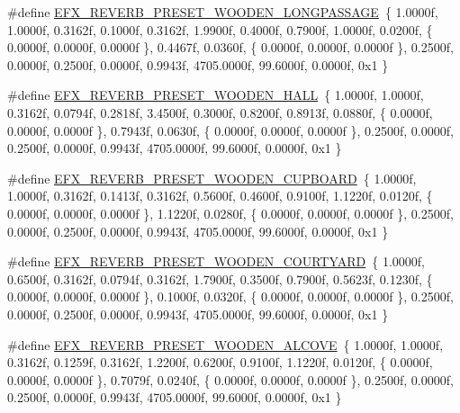 \begin{DoxyCompactItemize}
\item 
\#define \mbox{\hyperlink{efx-presets_8h_a18f21a9772e28cbc29f02cd7e52acff0}{E\+F\+X\+\_\+\+R\+E\+V\+E\+R\+B\+\_\+\+P\+R\+E\+S\+E\+T\+\_\+\+W\+O\+O\+D\+E\+N\+\_\+\+L\+O\+N\+G\+P\+A\+S\+S\+A\+GE}}~\{ 1.\+0000f, 1.\+0000f, 0.\+3162f, 0.\+1000f, 0.\+3162f, 1.\+9900f, 0.\+4000f, 0.\+7900f, 1.\+0000f, 0.\+0200f, \{ 0.\+0000f, 0.\+0000f, 0.\+0000f \}, 0.\+4467f, 0.\+0360f, \{ 0.\+0000f, 0.\+0000f, 0.\+0000f \}, 0.\+2500f, 0.\+0000f, 0.\+2500f, 0.\+0000f, 0.\+9943f, 4705.\+0000f, 99.\+6000f, 0.\+0000f, 0x1 \}
\item 
\#define \mbox{\hyperlink{efx-presets_8h_a15b475fde8954f5094393b00533d6684}{E\+F\+X\+\_\+\+R\+E\+V\+E\+R\+B\+\_\+\+P\+R\+E\+S\+E\+T\+\_\+\+W\+O\+O\+D\+E\+N\+\_\+\+H\+A\+LL}}~\{ 1.\+0000f, 1.\+0000f, 0.\+3162f, 0.\+0794f, 0.\+2818f, 3.\+4500f, 0.\+3000f, 0.\+8200f, 0.\+8913f, 0.\+0880f, \{ 0.\+0000f, 0.\+0000f, 0.\+0000f \}, 0.\+7943f, 0.\+0630f, \{ 0.\+0000f, 0.\+0000f, 0.\+0000f \}, 0.\+2500f, 0.\+0000f, 0.\+2500f, 0.\+0000f, 0.\+9943f, 4705.\+0000f, 99.\+6000f, 0.\+0000f, 0x1 \}
\item 
\#define \mbox{\hyperlink{efx-presets_8h_abdaf8eba9ef400263b72b92ef4d4ab23}{E\+F\+X\+\_\+\+R\+E\+V\+E\+R\+B\+\_\+\+P\+R\+E\+S\+E\+T\+\_\+\+W\+O\+O\+D\+E\+N\+\_\+\+C\+U\+P\+B\+O\+A\+RD}}~\{ 1.\+0000f, 1.\+0000f, 0.\+3162f, 0.\+1413f, 0.\+3162f, 0.\+5600f, 0.\+4600f, 0.\+9100f, 1.\+1220f, 0.\+0120f, \{ 0.\+0000f, 0.\+0000f, 0.\+0000f \}, 1.\+1220f, 0.\+0280f, \{ 0.\+0000f, 0.\+0000f, 0.\+0000f \}, 0.\+2500f, 0.\+0000f, 0.\+2500f, 0.\+0000f, 0.\+9943f, 4705.\+0000f, 99.\+6000f, 0.\+0000f, 0x1 \}
\item 
\#define \mbox{\hyperlink{efx-presets_8h_aab1028d9dc70b1bf4f86cf68d8eab1e2}{E\+F\+X\+\_\+\+R\+E\+V\+E\+R\+B\+\_\+\+P\+R\+E\+S\+E\+T\+\_\+\+W\+O\+O\+D\+E\+N\+\_\+\+C\+O\+U\+R\+T\+Y\+A\+RD}}~\{ 1.\+0000f, 0.\+6500f, 0.\+3162f, 0.\+0794f, 0.\+3162f, 1.\+7900f, 0.\+3500f, 0.\+7900f, 0.\+5623f, 0.\+1230f, \{ 0.\+0000f, 0.\+0000f, 0.\+0000f \}, 0.\+1000f, 0.\+0320f, \{ 0.\+0000f, 0.\+0000f, 0.\+0000f \}, 0.\+2500f, 0.\+0000f, 0.\+2500f, 0.\+0000f, 0.\+9943f, 4705.\+0000f, 99.\+6000f, 0.\+0000f, 0x1 \}
\item 
\#define \mbox{\hyperlink{efx-presets_8h_ab06028b7c454c3e43cc4caac83c461ac}{E\+F\+X\+\_\+\+R\+E\+V\+E\+R\+B\+\_\+\+P\+R\+E\+S\+E\+T\+\_\+\+W\+O\+O\+D\+E\+N\+\_\+\+A\+L\+C\+O\+VE}}~\{ 1.\+0000f, 1.\+0000f, 0.\+3162f, 0.\+1259f, 0.\+3162f, 1.\+2200f, 0.\+6200f, 0.\+9100f, 1.\+1220f, 0.\+0120f, \{ 0.\+0000f, 0.\+0000f, 0.\+0000f \}, 0.\+7079f, 0.\+0240f, \{ 0.\+0000f, 0.\+0000f, 0.\+0000f \}, 0.\+2500f, 0.\+0000f, 0.\+2500f, 0.\+0000f, 0.\+9943f, 4705.\+0000f, 99.\+6000f, 0.\+0000f, 0x1 \}

\end{DoxyCompactItemize}
